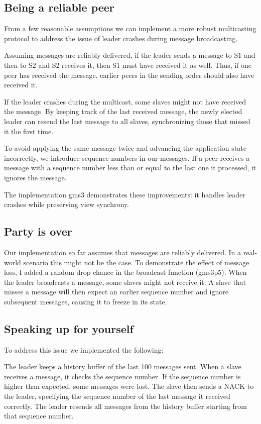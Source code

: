 \documentclass[a4paper, 11pt]{article}
\begin{document}
\subsection{Being a reliable peer}
From a few reasonable assumptions we can implement a more robust multicasting protocol to address the issue of leader crashes during message broadcasting.

Assuming messages are reliably delivered, if the leader sends a message to S1 and then to S2 and S2 receives it, then S1 must have received it as well. Thus, if one peer has received the message, earlier peers in the sending order should also have received it.

If the leader crashes during the multicast, some slaves might not have received the message. By keeping track of the last received message, the newly elected leader can resend the last message to all slaves, synchronizing those that missed it the first time.

To avoid applying the same message twice and advancing the application state incorrectly, we introduce sequence numbers in our messages. If a peer receives a message with a sequence number less than or equal to the last one it processed, it ignores the message.

The implementation gms3 demonstrates these improvements: it handles leader crashes while preserving view synchrony.

\subsection{Party is over}
Our implementation so far assumes that messages are reliably delivered. In a real-world scenario this might not be the case. To demonstrate the effect of message loss, I added a random drop chance in the broadcast function (gms3p5). When the leader broadcasts a message, some slaves might not receive it. A slave that misses a message will then expect an earlier sequence number and ignore subsequent messages, causing it to freeze in its state.

\subsection{Speaking up for yourself}
To address this issue we implemented the following:

The leader keeps a history buffer of the last 100 messages sent. When a slave receives a message, it checks the sequence number. If the sequence number is higher than expected, some messages were lost. The slave then sends a NACK to the leader, specifying the sequence number of the last message it received correctly. The leader resends all messages from the history buffer starting from that sequence number.
\end{document}
